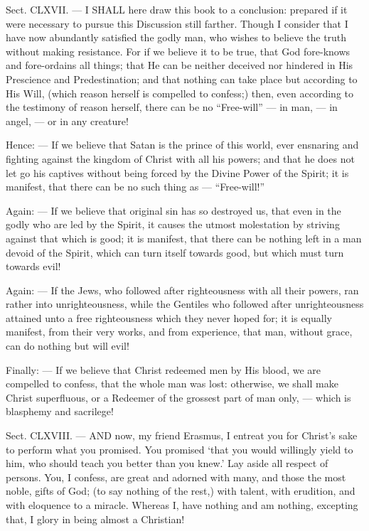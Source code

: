 

Sect. CLXVII. — I \textsc{SHALL} here draw this book to a conclusion: prepared if it were necessary to pursue this Discussion still farther. Though I consider that I have now abundantly satisfied the godly man, who wishes to believe the truth without making resistance. For if we believe it to be true, that God fore-knows and fore-ordains all things; that He can be neither deceived nor hindered in His Prescience and Predestination; and that nothing can take place but according to His Will, (which reason herself is compelled to confess;) then, even according to the testimony of reason herself, there can be no “Free-will” — in man, — in angel, — or in any creature!

Hence: — If we believe that Satan is the prince of this world, ever ensnaring and fighting against the kingdom of Christ with all his powers; and that he does not let go his captives without being forced by the Divine Power of the Spirit; it is manifest, that there can be no such thing as — “Free-will!”

Again: — If we believe that original sin has so destroyed us, that even in the godly who are led by the Spirit, it causes the utmost molestation by striving against that which is good; it is manifest, that there can be nothing left in a man devoid of the Spirit, which can turn itself towards good, but which must turn towards evil!

Again: — If the Jews, who followed after righteousness with all their powers, ran rather into unrighteousness, while the Gentiles who followed after unrighteousness attained unto a free righteousness which they never hoped for; it is equally manifest, from their very works, and from experience, that man, without grace, can do nothing but will evil!

Finally: — If we believe that Christ redeemed men by His blood, we are compelled to confess, that the whole man was lost: otherwise, we shall make Christ superfluous, or a Redeemer of the grossest part of man only, — which is blasphemy and sacrilege!


Sect. CLXVIII. — AND now, my friend Erasmus, I entreat you for Christ’s sake to perform what you promised. You promised ‘that you would willingly yield to him, who should teach you better than you knew.’ Lay aside all respect of persons. You, I confess, are great and adorned with many, and those the most noble, gifts of God; (to say nothing of the rest,) with talent, with erudition, and with eloquence to a miracle. Whereas I, have nothing and am nothing, excepting that, I glory in being almost a Christian!

